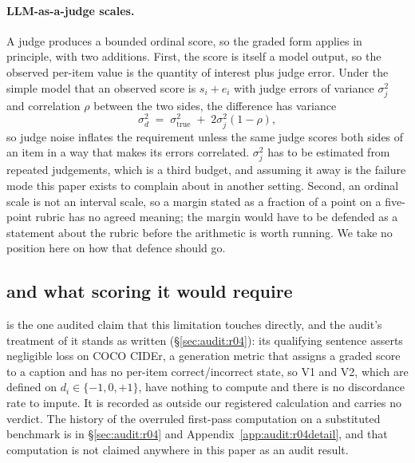 \paragraph{LLM-as-a-judge scales.} A judge produces a bounded ordinal score, so
the graded form applies in principle, with two additions. First, the score is
itself a model output, so the observed per-item value is the quantity of
interest plus judge error. Under the simple model that an observed score is
$s_i + e_i$ with judge errors of variance $\sigma_j^2$ and correlation $\rho$
between the two sides, the difference has variance
\begin{equation}
\sigma_d^2 \;=\; \sigma_{\mathrm{true}}^2 \;+\; 2\sigma_j^2 (1 - \rho),
\label{eq:judge-variance}
\end{equation}
so judge noise inflates the requirement unless the same judge scores both sides
of an item in a way that makes its errors correlated. $\sigma_j^2$ has to be
estimated from repeated judgements, which is a third budget, and assuming it
away is the failure mode this paper exists to complain about in another setting.
Second, an ordinal scale is not an interval scale, so a margin stated as a
fraction of a point on a five-point rubric has no agreed meaning; the margin
would have to be defended as a statement about the rubric before the arithmetic
is worth running. We take no position here on how that defence should go.

\subsection{\AuditOutsideFrameworkClaim{} and what scoring it would require}
\label{app:continuous:r04}

\AuditOutsideFrameworkClaim{} is the one audited claim that this limitation
touches directly, and the audit's treatment of it stands as written
(\S\ref{sec:audit:r04}): its qualifying sentence asserts negligible loss on COCO
CIDEr, a generation metric that assigns a graded score to a caption and has no
per-item correct/incorrect state, so V1 and V2, which are defined on $d_i \in
\{-1,0,+1\}$, have nothing to compute and there is no discordance rate to impute.
It is recorded as outside our registered calculation and carries no verdict. The
history of the overruled first-pass computation on a substituted benchmark is in
\S\ref{sec:audit:r04} and Appendix~\ref{app:audit:r04detail}, and that
computation is not claimed anywhere in this paper as an audit result.

